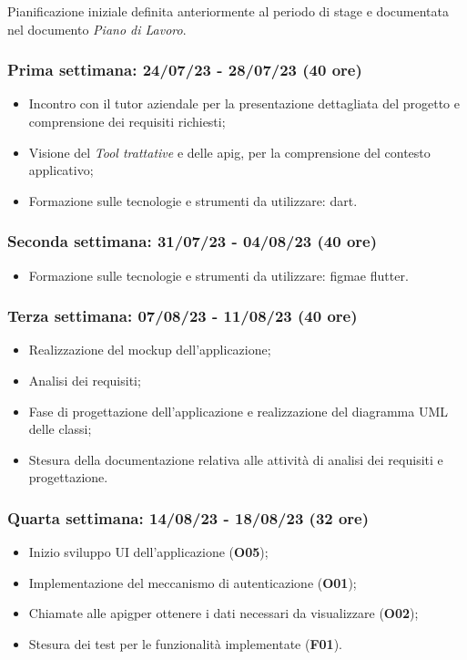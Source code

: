 Pianificazione iniziale definita anteriormente al periodo di stage e documentata nel documento \emph{Piano di Lavoro}.\\

\subsubsection{Prima settimana: 24/07/23 - 28/07/23 (40 ore)}
    \begin{itemize}
        \item Incontro con il tutor aziendale per la presentazione dettagliata del progetto e comprensione dei requisiti richiesti;
        \item Visione del \emph{Tool trattative} e delle \gls{apig}\glsoccur, per la comprensione del contesto applicativo;
        \item Formazione sulle tecnologie e strumenti da utilizzare: \gls{dart}\glsoccur.
    \end{itemize}
\subsubsection{Seconda settimana: 31/07/23 - 04/08/23 (40 ore)}
    \begin{itemize}
        \item Formazione sulle tecnologie e strumenti da utilizzare: \gls{figma}\glsoccur e \gls{flutter}\glsoccur.
    \end{itemize}
\subsubsection{Terza settimana: 07/08/23 - 11/08/23 (40 ore)}
    \begin{itemize}
        \item Realizzazione del \gls{mockup} dell'applicazione;
        \item Analisi dei requisiti;
        \item Fase di progettazione dell'applicazione e realizzazione del diagramma UML delle classi;
        \item Stesura della documentazione relativa alle attività di analisi dei requisiti e progettazione.
    \end{itemize}
\subsubsection{Quarta settimana: 14/08/23 - 18/08/23 (32 ore)}
    \begin{itemize}
        \item Inizio sviluppo UI dell'applicazione (\textbf{O05});
        \item Implementazione del meccanismo di autenticazione (\textbf{O01});
        \item Chiamate alle \gls{apig}\glsoccur per ottenere i dati necessari da visualizzare (\textbf{O02});
        \item Stesura dei test per le funzionalità implementate (\textbf{F01}).
    \end{itemize}
